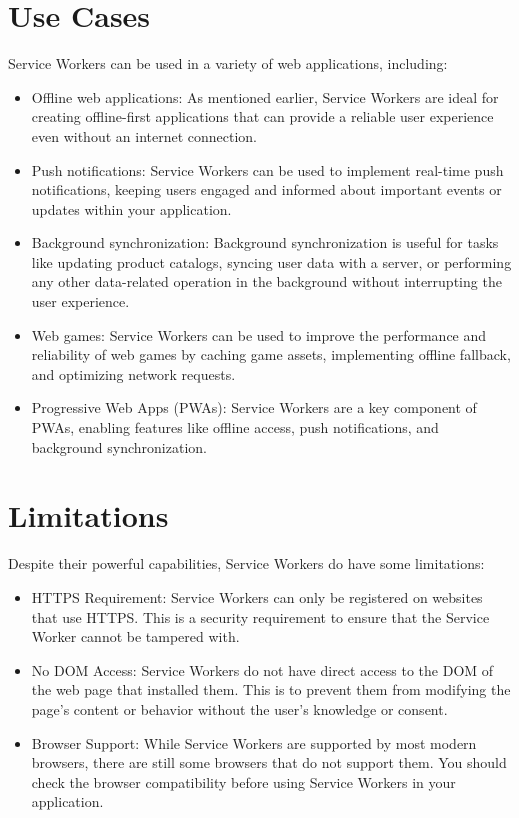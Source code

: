 \documentclass{report}
\begin{document}
\section{Use Cases}\label{Use Cases}
Service Workers can be used in a variety of web applications, including:

\begin{itemize}
    \item Offline web applications: As mentioned earlier, Service Workers are ideal for creating offline-first applications that can provide a reliable user experience even without an internet connection.
    \item Push notifications: Service Workers can be used to implement real-time push notifications, keeping users engaged and informed about important events or updates within your application.
    \item Background synchronization: Background synchronization is useful for tasks like updating product catalogs, syncing user data with a server, or performing any other data-related operation in the background without interrupting the user experience.
    \item Web games: Service Workers can be used to improve the performance and reliability of web games by caching game assets, implementing offline fallback, and optimizing network requests.
    \item Progressive Web Apps (PWAs): Service Workers are a key component of PWAs, enabling features like offline access, push notifications, and background synchronization. \cite{jakearchibald23}

\end{itemize}

\section{Limitations}\label{Limitations}
Despite their powerful capabilities, Service Workers do have some limitations:

\begin{itemize}
    \item HTTPS Requirement: Service Workers can only be registered on websites that use HTTPS. This is a security requirement to ensure that the Service Worker cannot be tampered with.
    \item No DOM Access: Service Workers do not have direct access to the DOM of the web page that installed them. This is to prevent them from modifying the page's content or behavior without the user's knowledge or consent.
    \item Browser Support: While Service Workers are supported by most modern browsers, there are still some browsers that do not support them. You should check the browser compatibility before using Service Workers in your application. \cite{w3c23}
\end{itemize}
\end{document}

